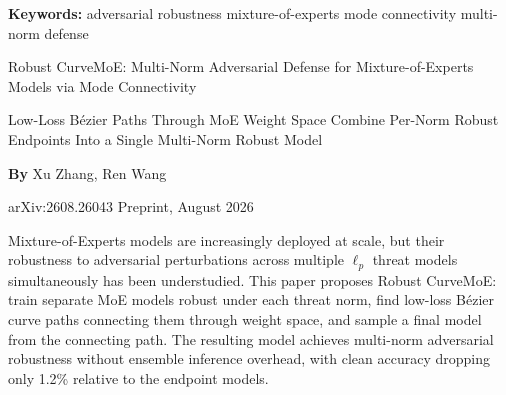 \documentclass[10pt,twocolumn]{article}
\begin{document}
\setlength{\parindent}{0pt}
\setlength{\parskip}{4pt}

{\small\color{keywordgray}\textbf{Keywords:}
  adversarial robustness \textbullet{}
  mixture-of-experts \textbullet{}
  mode connectivity \textbullet{}
  multi-norm defense}\par\vspace{4pt}

{\LARGE\bfseries\raggedright
  Robust CurveMoE: Multi-Norm Adversarial
  Defense for Mixture-of-Experts Models
  via Mode Connectivity}\par\vspace{4pt}

{\large\itshape\raggedright
  Low-Loss Bézier Paths Through MoE Weight Space
  Combine Per-Norm Robust Endpoints Into a
  Single Multi-Norm Robust Model}\par\vspace{6pt}

{\small\textbf{By} Xu Zhang, Ren Wang}\par\vspace{2pt}

{\small\color{keywordgray}arXiv:2608.26043 \textbullet{} Preprint, August 2026}
\par\vspace{2pt}\noindent{\color{rulered}\rule{\columnwidth}{0.6pt}}\vspace{6pt}

Mixture-of-Experts models are increasingly deployed at scale, but their
robustness to adversarial perturbations across multiple $\ell_p$ threat
models simultaneously has been understudied. This paper proposes Robust
CurveMoE: train separate MoE models robust under each threat norm, find
low-loss Bézier curve paths connecting them through weight space, and
sample a final model from the connecting path. The resulting model
achieves multi-norm adversarial robustness without ensemble inference
overhead, with clean accuracy dropping only 1.2\% relative to the
endpoint models.
\end{document}
